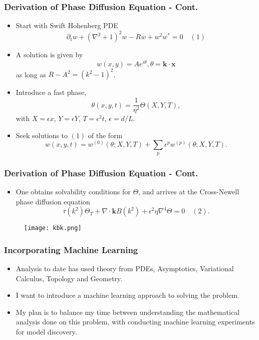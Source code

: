 \documentclass[]{beamer}
\begin{document}
\begin{frame}
    \frametitle{Derivation of Phase Diffusion Equation - Cont.}
    \begin{itemize}
        \item Start with Swift Hohenberg PDE
            \[
                \partial_t w + (\nabla^2+1)^2w - Rw + w^2w^{*} = 0 \quad (1)
            \] 
        \item A solution is given by 
            \[
                w(x,y)=Ae^{i\theta}, \theta= \bm{k} \cdot \bm{x}
            \] 
            as long as $R-A^2 = (k^2-1)^2$.
        \item Introduce a fast phase,
            \[
                \theta(x,y,t) = \frac{1}{\eta^2}\Theta(X,Y,T),
            \] 
            with $X=\epsilon x$, $Y=\epsilon Y$, $T=\epsilon^2 t$, $\epsilon = d/L$.
        \item Seek solutions to $(1)$ of the form
            \[
                w(x,y,t) = w^{(0)}(\theta;X,Y,T)+\sum_{p}\epsilon^{p}w^{(p)}(\theta;X,Y,T).
            \] 
    \end{itemize}
\end{frame}

\begin{frame}
    \frametitle{Derivation of Phase Diffusion Equation - Cont.}
    \begin{itemize}
        \item One obtains solvability conditions for $\Theta$, and arrives at the Cross-Newell phase diffusion equation
            \[
                \tau(k^2)\Theta_T + \nabla \cdot \bm{k}B(k^2)+\epsilon^2\eta\nabla^4\Theta = 0 \quad (2).
            \] 
    \end{itemize}
    \begin{figure}
        \centering
        \texttt{[image: kbk.png]}
    \end{figure}
\end{frame}

\begin{frame}
    \frametitle{Incorporating Machine Learning}
    \begin{itemize}
        \item Analysis to date has used theory from PDEs, Asymptotics, Variational Calculus, Topology and Geometry.
        \item I want to introduce a machine learning approach to solving the problem.
        \item My plan is to balance my time between understanding the mathematical analysis done on this problem, with conducting machine learning experiments for model discovery.
    \end{itemize}
\end{frame}
\end{document}
